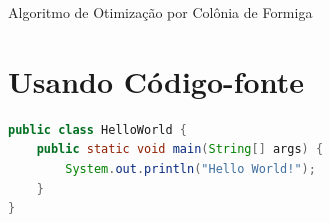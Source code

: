 \lipsum[8]

\begin{algorithm}[h!]
	\SetSpacedAlgorithm
	\caption{\label{alg:algoritmo_de_colonica_de_formigas}Algoritmo de Otimização por Colônia de Formiga}
\end{algorithm}

\lipsum[9]

\section{Usando Código-fonte}

\lipsum[10]



\lipsum[11]

\begin{lstlisting}[language=Java,caption={Hello World em Java}]
public class HelloWorld {
	public static void main(String[] args) {
		System.out.println("Hello World!");
	}
}
\end{lstlisting}

\lipsum[11]